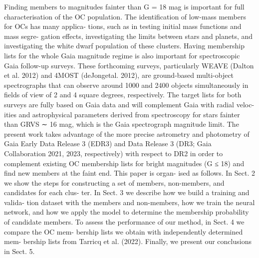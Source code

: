 \documentclass[../main.tex]{subfiles}
\begin{document}
Finding members to magnitudes fainter than G = 18 mag is important for full characterisation of the OC population. The identification of low-mass members for OCs has many applica- tions, such as in testing initial mass functions and mass segre- gation effects, investigating the limits between stars and planets, and investigating the white dwarf population of these clusters. Having membership lists for the whole Gaia magnitude regime is also important for spectroscopic Gaia follow-up surveys. These forthcoming surveys, particularly WEAVE (Dalton et al. 2012) and 4MOST (deJongetal. 2012), are ground-based multi-object spectrographs that can observe around 1000 and 2400 objects simultaneously in fields of view of 2 and 4 square degrees, respectively. The target lists for both surveys are fully based on Gaia data and will complement Gaia with radial veloc- ities and astrophysical parameters derived from spectroscopy for stars fainter than GRVS ∼ 16 mag, which is the Gaia spectrograph magnitude limit.
The present work takes advantage of the more precise astrometry and photometry of Gaia Early Data Release 3 (EDR3) and Data Release 3 (DR3; Gaia Collaboration 2021, 2023, respectively) with respect to DR2 in order to complement existing OC membership lists for bright magnitudes (G ≤ 18) and find new members at the faint end. This paper is organ- ised as follows. In Sect. 2 we show the steps for constructing a set of members, non-members, and candidates for each clus- ter. In Sect. 3 we describe how we build a training and valida- tion dataset with the members and non-members, how we train the neural network, and how we apply the model to determine the membership probability of candidate members. To assess the performance of our method, in Sect. 4 we compare the OC mem- bership lists we obtain with independently determined mem- bership lists from Tarricq et al. (2022). Finally, we present our conclusions in Sect. 5.
\end{document}

